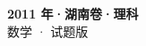 \documentclass[zihao=-4, a4paper]{ctexart}
\begin{document}
\begin{center}
  {\Large\bfseries 2011 年·湖南卷·理科}\\[4pt]
  {\large 数学 · 试题版}
\end{center}
\medskip
{}

\end{document}
